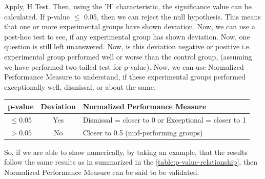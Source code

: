 \documentclass[a4paper,fleqn,review]{cas-sc}
\begin{document}
Apply, \cite{kruskal1952use} H Test. Then, using the 'H' characteristic, the significance value can be calculated. If p-value $\le$ 0.05, then we can reject the null hypothesis. This means that one or more experimental groups have shown deviation. Now, we can use a post-hoc \cite{dunnett1955multiple} test to see, if any experimental group has shown deviation. Now, one question is still left unanswered. Now, is this deviation negative or positive i.e. experimental group performed well or worse than the control group, (assuming we have performed two-tailed test for p-value). Now, we can use Normalized Performance Measure to understand, if these experimental groups performed exceptionally well, dismissal, or about the same.
\begin{center}
	\begin{tabular}{|c|c|l|}
		\hline
		\textbf{p-value} & \textbf{Deviation} & \textbf{Normalized Performance Measure} \\
		\hline
		$\leq 0.05$ & Yes & Dismissal = closer to 0 or Exceptional = closer to 1 \\
		\hline
		$> 0.05$ & No & Closer to 0.5 (mid-performing groups) \\
		\hline
	\end{tabular}
	\vspace{2pt}
	\label{table:p-value-relationship}
\end{center}
So, if we are able to show numerically, by taking an example, that the results follow the same results as in summarized in the \autoref{table:p-value-relationship}, then Normalized Performance Measure can be said to be validated.
\end{document}
